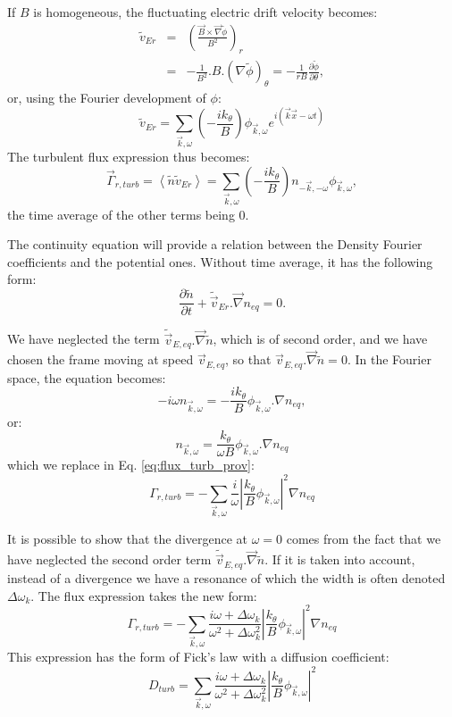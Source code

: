 If $B$ is homogeneous, the fluctuating electric drift velocity becomes:
\begin{eqnarray*}
		\tilde{v}_{Er} & = & \left( \frac{\vec{B} \times \vec{\nabla}\tilde{\phi}}{B^2} \right)_r	\\
									 & = & -\frac{1}{B^2}. B.\left( \nabla \tilde{\phi} \right)_\theta = - \frac{1}{rB}\frac{\partial\tilde{\phi}}{\partial\theta},
\end{eqnarray*}
or, using the Fourier development of $\phi$:
\[
		\tilde{v}_{Er} = \sum_{\vec{k},\omega} \left( -\frac{ik_\theta}{B} \right) \phi_{\vec{k},\omega} e^{i(\vec{k}\vec{x}-\omega t)}
\]
The turbulent flux expression thus becomes:
\begin{equation}
		\vec{\Gamma}_{r,turb} = \left< \tilde{n} \tilde{v}_{Er} \right> = \sum_{\vec{k},\omega} \left( -\frac{ik_\theta}{B} \right) n_{-\vec{k},-\omega} \phi_{\vec{k},\omega},
	\label{eq:flux_turb_prov}
\end{equation}
the time average of the other terms being 0. 

The continuity equation will provide a relation between the Density Fourier coefficients and the potential ones. Without time average, it has the following form:
\[
		\frac{\partial \tilde{n}}{\partial t} + \tilde{\vec{v}}_{Er}.\vec{\nabla}n_{eq} = 0.
\]

We have neglected the term $\tilde{\vec{v}}_{E,eq}.\vec{\nabla}\tilde{n}$, which is of second order, and we have chosen the frame moving at speed $\vec{v}_{E,eq}$, so that $\vec{v}_{E,eq}.\vec{\nabla}\tilde{n} = 0$. In the Fourier space, the equation becomes:
\[
		-i\omega n_{\vec{k},\omega} = -\frac{ik_\theta}{B} \phi_{\vec{k},\omega}.\nabla n_{eq},
\]
or:
\[
		n_{\vec{k},\omega} = \frac{k_\theta}{\omega B} \phi_{\vec{k},\omega}.\nabla n_{eq}
\]
which we replace in Eq. \ref{eq:flux_turb_prov}:
\[
		\Gamma_{r,turb} = - \sum_{\vec{k},\omega} \frac{i}{\omega} \left| \frac{k_\theta}{B}\phi_{\vec{k},\omega} \right|^2 \nabla n_{eq}
\]

It is possible to show that the divergence at $\omega = 0$ comes from the fact that we have neglected the second order term $\tilde{\vec{v}}_{E,eq}.\vec{\nabla}\tilde{n}$. If it is taken into account, instead of a divergence we have a resonance of which the width is often denoted $\Delta\omega_k$. The flux expression takes the new form:
\[
		\Gamma_{r,turb} = - \sum_{\vec{k},\omega} \frac{i\omega + \Delta\omega_k}{\omega^2+\Delta\omega_k^2} \left| \frac{k_\theta}{B}\phi_{\vec{k},\omega} \right|^2 \nabla n_{eq}
\]
This expression has the form of Fick's law with a diffusion coefficient:
\[
		D_{turb} = \sum_{\vec{k},\omega} \frac{i\omega + \Delta\omega_k}{\omega^2+\Delta\omega_k^2} \left| \frac{k_\theta}{B}\phi_{\vec{k},\omega} \right|^2
\]

